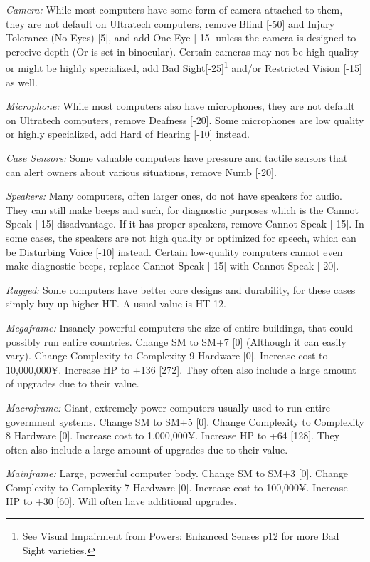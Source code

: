 \begin{multicols*}{3}
	\textit{Camera:} While most computers have some form of camera attached to them, they are not default on Ultratech computers, remove Blind [-50] and Injury Tolerance (No Eyes) [5], and add One Eye [-15] unless the camera is designed to perceive depth (Or is set in binocular). Certain cameras may not be high quality or might be highly specialized, add Bad Sight[-25]\footnote{See Visual Impairment from Powers: Enhanced Senses p12 for more Bad Sight varieties.} and/or Restricted Vision [-15] as well.
	
	\textit{Microphone:} While most computers also have microphones, they are not default on Ultratech computers, remove Deafness [-20]. Some microphones are low quality or highly specialized, add Hard of Hearing [-10] instead.
	
	\textit{Case Sensors:} Some valuable computers have pressure and tactile sensors that can alert owners about various situations, remove Numb [-20].
	
	\textit{Speakers:} Many computers, often larger ones, do not have speakers for audio. They can still make beeps and such, for diagnostic purposes which is the Cannot Speak [-15] disadvantage. If it has proper speakers, remove Cannot Speak [-15]. In some cases, the speakers are not high quality or optimized for speech, which can be Disturbing Voice [-10] instead. Certain low-quality computers cannot even make diagnostic beeps, replace Cannot Speak [-15] with Cannot Speak [-20].
	
	\textit{Rugged:} Some computers have better core designs and durability, for these cases simply buy up higher HT. A usual value is HT 12.
	
	\textit{Megaframe:} Insanely powerful computers the size of entire buildings, that could possibly run entire countries. Change SM to SM+7 [0] (Although it can easily vary). Change Complexity to Complexity 9 Hardware [0]. Increase cost to 10,000,000¥. Increase HP to +136 [272]. They often also include a large amount of upgrades due to their value.
	
	\textit{Macroframe:} Giant, extremely power computers usually used to run entire government systems. Change SM to SM+5 [0]. Change Complexity to Complexity 8 Hardware [0]. Increase cost to 1,000,000¥. Increase HP to +64 [128]. They often also include a large amount of upgrades due to their value.
	
	\textit{Mainframe:} Large, powerful computer body. Change SM to SM+3 [0]. Change Complexity to Complexity 7 Hardware [0]. Increase cost to 100,000¥. Increase HP to +30 [60]. Will often have additional upgrades.
	

\end{multicols*}
